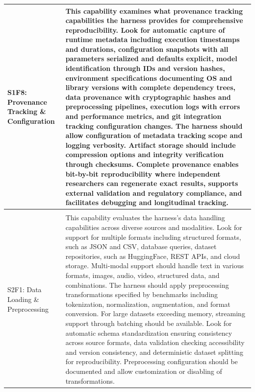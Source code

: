 \begin{longtable}{>{\raggedright\arraybackslash}p{3cm}|>{\raggedright\arraybackslash}p{16cm}}
S1F8: Provenance Tracking \& Configuration & This capability examines what provenance tracking capabilities the harness provides for comprehensive reproducibility. Look for automatic capture of runtime metadata including execution timestamps and durations, configuration snapshots with all parameters serialized and defaults explicit, model identification through IDs and version hashes, environment specifications documenting OS and library versions with complete dependency trees, data provenance with cryptographic hashes and preprocessing pipelines, execution logs with errors and performance metrics, and git integration tracking configuration changes. The harness should allow configuration of metadata tracking scope and logging verbosity. Artifact storage should include compression options and integrity verification through checksums. Complete provenance enables bit-by-bit reproducibility where independent researchers can regenerate exact results, supports external validation and regulatory compliance, and facilitates debugging and longitudinal tracking. \\
\hline

\multicolumn{2}{l}{\textbf{STAGE 2: EXECUTE -- Operational Evaluation Execution (7 capabilities)}} \\
\hline

S2F1: Data Loading \& Preprocessing & This capability evaluates the harness's data handling capabilities across diverse sources and modalities. Look for support for multiple formats including structured formats, such as JSON and CSV, database queries, dataset repositories, such as HuggingFace, REST APIs, and cloud storage. Multi-modal support should handle text in various formats, images, audio, video, structured data, and combinations. The harness should apply preprocessing transformations specified by benchmarks including tokenization, normalization, augmentation, and format conversion. For large datasets exceeding memory, streaming support through batching should be available. Look for automatic schema standardization ensuring consistency across source formats, data validation checking accessibility and version consistency, and deterministic dataset splitting for reproducibility. Preprocessing configuration should be documented and allow customization or disabling of transformations. \\
\hline


\end{longtable}
